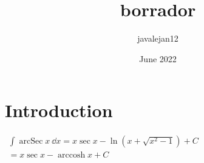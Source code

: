 \documentclass{article}
\title{borrador}
\author{javalejan12 }
\date{June 2022}
\DeclareMathOperator{\arccosh}{arccosh}
\DeclareMathOperator{\arcsec}{arcSec}
\newcommand{\dst}{\displaystyle}
\begin{document}

\section{Introduction}

\centering
\ensuremath{   
\begin{array}{c}
\dst \int \arcsec x \:\dd x=x\sec x-\ln(x+\sqrt{x^2-1}) +C  \\
=x\sec x-\arccosh x +C 
\end{array}  
} 
\end{document}
